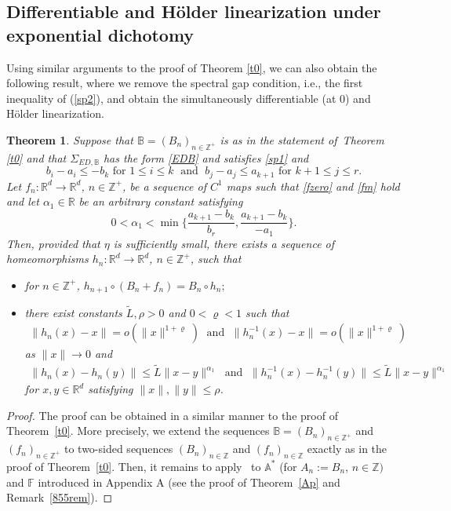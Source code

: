 \documentclass[reqno, a4paper, 10pt]{amsart}
\theoremstyle{plain}
\numberwithin{equation}{section}
\newtheorem{theorem}{Theorem}
\theoremstyle{remark}
\def\R{\mathbb{R}}
\def\Z{\mathbb{Z}}
\begin{document}
\subsection{Differentiable and H\"older linearization under exponential dichotomy}
Using similar arguments to the proof of Theorem \ref{t0}, we can also obtain the following result, where we remove the spectral gap condition, i.e., the first inequality of (\ref{sp2}), and obtain the simultaneously differentiable (at 0) and H\"older linearization.
\begin{theorem}\label{t1}
Suppose that $\mathbb B=(B_n)_{n\in \Z^+}$ is as in the statement  of~Theorem {\rm \ref{t0}} and that $\Sigma_{ED, \mathbb B}$ has the form \eqref{EDB} and satisfies \eqref{sp1} and
\begin{equation}\label{sp3}
b_i-a_i\le -b_k \text{ for } 1\le i\le k \;\text{ and }\; b_j-a_j\le a_{k+1} \text{ for } k+1\le j \le r.
\end{equation}
Let $f_n\colon \R^d \to \R^d$, $n\in \Z^+$, be a sequence of $C^1$ maps such that \eqref{fzero} and \eqref{fm} hold and let $\alpha_1\in \mathbb{R}$ be an arbitrary constant satisfying
\begin{equation*}\label{alpha1}
    0<\alpha_1<\min\Big\{\frac{ a_{k+1}- b_k}{ b_r},\frac{ a_{k+1}- b_{k}}{ -a_1}\Big\}.
\end{equation*}
Then, provided that $\eta$ is sufficiently small, there exists a sequence of homeomorphisms $h_n\colon \R^d\to \R^d$, $n\in \Z^+$, such that
\begin{itemize}
\item for $n\in \Z^+$,
$
h_{n+1} \circ (B_n+f_n)=B_n\circ h_n;
$
\item there exist constants $\tilde L, \rho>0$ and $0<\varrho<1$ such that
\begin{align*}
\|h_n(x)-x\|=o(\|x\|^{1+\varrho}) \; \text{ and } \; \|h_n^{-1}(x)-x\|=o(\|x\|^{1+\varrho})
\end{align*}
as $\|x\|\to 0$ and
\begin{align*}
\|h_n(x)-h_n(y)\|\!\le\! \tilde L\|x-y\|^{\alpha_1} \; \text{ and }\;
\|h_n^{-1}(x)-h_n^{-1}(y)\|\!\le\! \tilde L \|x-y\|^{\alpha_1}
\end{align*}
for $x,y\in \mathbb{R}^d$ satisfying $\|x\|,\|y\|\le \rho$.
\end{itemize}
\end{theorem}

\begin{proof}
The proof can be obtained in a similar manner to the proof of Theorem~\ref{t0}. More precisely, we extend the sequences $\mathbb B=(B_n)_{n\in \Z^+}$ and $(f_n)_{n\in \Z^+}$ to two-sided sequences $(B_n)_{n\in \Z}$ and $(f_n)_{n\in \Z}$
 exactly as in the proof of Theorem~\ref{t0}. Then, it remains to apply~\cite[Lemma 4]{DZZ20} to $\mathbb A^*$ (for $A_n:=B_n$, $n\in \mathbb Z)$ and $\mathbb F$ introduced in Appendix A (see the proof of Theorem~\ref{Ap} and Remark~\ref{855rem}).
\end{proof}
\end{document}
